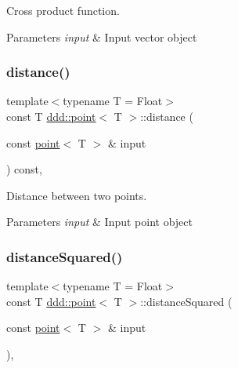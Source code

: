 Cross product function. 


\begin{DoxyParams}{Parameters}
{\em input} & Input vector object \\
\hline
\end{DoxyParams}
\mbox{\label{classddd_1_1point_a59d8714cc178090ddf75b0c9dbd832c9}} 
\subsubsection{\texorpdfstring{distance()}{distance()}}
{\footnotesize\ttfamily template$<$typename T = Float$>$ \\
const T \hyperlink{classddd_1_1point}{ddd\+::point}$<$ T $>$\+::distance (\begin{DoxyParamCaption}\item[{const \hyperlink{classddd_1_1point}{point}$<$ T $>$ \&}]{input }\end{DoxyParamCaption}) const\hspace{0.3cm}{\ttfamily [inline]}, {\ttfamily [inherited]}}



Distance between two points. 


\begin{DoxyParams}{Parameters}
{\em input} & Input point object \\
\hline
\end{DoxyParams}
\mbox{\label{classddd_1_1point_a4b6793fd154fc9ad4dd93a4927d4ee13}} 
\subsubsection{\texorpdfstring{distance\+Squared()}{distanceSquared()}}
{\footnotesize\ttfamily template$<$typename T = Float$>$ \\
const T \hyperlink{classddd_1_1point}{ddd\+::point}$<$ T $>$\+::distance\+Squared (\begin{DoxyParamCaption}\item[{const \hyperlink{classddd_1_1point}{point}$<$ T $>$ \&}]{input }\end{DoxyParamCaption})\hspace{0.3cm}{\ttfamily [inline]}, {\ttfamily [inherited]}}



